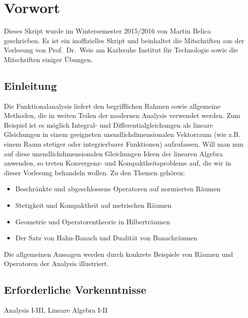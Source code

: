 
\chapter*{Vorwort}
Dieses Skript wurde im Wintersemester 2015/2016
von Martin Belica geschrieben. Es ist ein inoffizielles Skript und beinhaltet die Mitschriften aus
der Vorlesung von Prof.~Dr.~Weis am Karlsruhe Institut für Technologie sowie die Mitschriften einiger
Übungen.

\thispagestyle{empty}

\section*{Einleitung}

Die Funktionalanalysis liefert den begrifflichen Rahmen sowie allgemeine Methoden, die in weiten Teilen der modernen Analysis verwendet werden. Zum Beispiel ist es möglich Integral- und Differentialgleichungen als lineare Gleichungen in einem geeigneten unendlichdimensionalen Vektorraum (wie z.B. einem Raum stetiger oder integrierbarer Funktionen) aufzufassen. Will man nun auf diese unendlichdimensionalen Gleichungen Ideen der linearen Algebra anwenden, so treten Konvergenz- und Kompaktheitsprobleme auf, die wir in dieser Vorlesung behandeln wollen. Zu den Themen gehören:

  \begin{itemize}
     \item Beschränkte und abgeschlossene Operatoren auf normierten Räumen
     \item Stetigkeit und Kompaktheit auf metrischen Räumen
     \item Geometrie und Operatorentheorie in Hilberträumen
     \item Der Satz von Hahn-Banach und Dualität von Banachräumen    
  \end{itemize}
  
Die allgemeinen Aussagen werden durch konkrete Beispiele von Räumen und Operatoren der Analysis illustriert.

\section*{Erforderliche Vorkenntnisse}
Analysis I-III, Lineare Algebra I-II


\begin{center}	

\end{center}